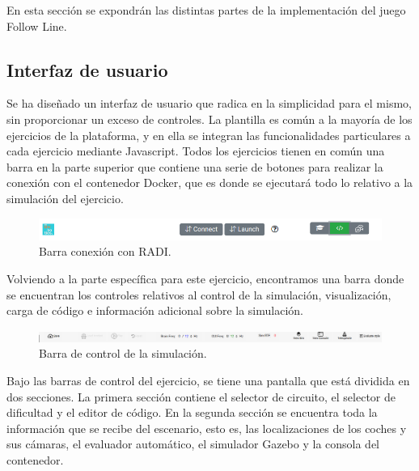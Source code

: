 \documentclass[a4paper, 12pt]{book}
\begin{document}
En esta sección se expondrán las distintas partes de la implementación del juego Follow Line.

\subsection{Interfaz de usuario}

Se ha diseñado un interfaz de usuario que radica en la simplicidad para el mismo, sin proporcionar un exceso de controles. La plantilla es común a la mayoría de los ejercicios de la plataforma, y en ella se integran las funcionalidades particulares a cada ejercicio mediante Javascript. Todos los ejercicios tienen en común una barra en la parte superior que contiene una serie de botones para realizar la conexión con el contenedor Docker, que es donde se ejecutará todo lo relativo a la simulación del ejercicio.

\begin{figure}[H]
	\centering
    \includegraphics[width=15cm]{img/barra_radi.png}
    \caption{Barra conexión con RADI.}
    \label{figura:conexion_radi}
\end{figure}

Volviendo a la parte específica para este ejercicio, encontramos una barra donde se encuentran los controles relativos al control de la simulación, visualización, carga de código e información adicional sobre la simulación.

\begin{figure}[H]
	\centering
    \includegraphics[width=15cm]{img/barra_control.png}
    \caption{Barra de control de la simulación.}
    \label{figura:conexion_radi}
\end{figure}

Bajo las barras de control del ejercicio, se tiene una pantalla que está dividida en dos secciones. La primera sección contiene el selector de circuito, el selector de dificultad y el editor de código. En la segunda sección se encuentra toda la información que se recibe del escenario, esto es, las localizaciones de los coches y sus cámaras, el evaluador automático, el simulador Gazebo y la consola del contenedor.
\end{document}
